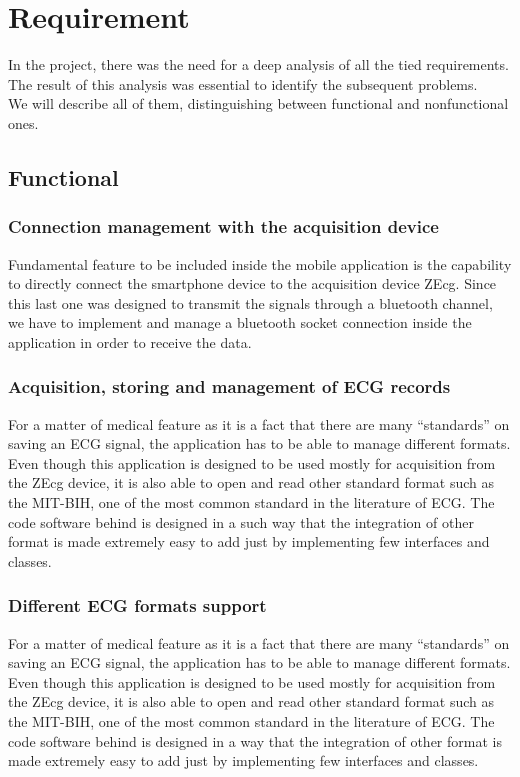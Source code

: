 \chapter{Requirement}
\label{Chapter5}
In the project, there was the need for a deep analysis of all the tied requirements. The result of this analysis was essential to identify the subsequent problems.\\
We will describe all of them, distinguishing between functional and nonfunctional ones.

\section{Functional}

\subsection{Connection management with the acquisition device}
Fundamental feature to be included inside the mobile application is the capability to directly connect the smartphone device to the acquisition device ZEcg. Since this last one was designed to transmit the signals through a bluetooth channel, we have to implement and manage a bluetooth socket connection inside the application in order to receive the data.

\subsection{Acquisition, storing and management of ECG records}
For a matter of medical feature as it is a fact that there are many “standards” on saving an ECG signal, the application has to be able to manage different formats. Even though this application is designed to be used mostly for acquisition from the ZEcg device, it is also able to open and read other standard format such as the MIT-BIH, one of the most common standard in the literature of ECG. The code software behind is designed in a such  way that the integration of other format is made extremely easy to add just by implementing few interfaces and classes.

\subsection{Different ECG formats support}
For a matter of medical feature as it is a fact that there are many “standards” on saving an ECG signal, the application has to be able to manage different formats. Even though this application is designed to be used mostly for acquisition from the ZEcg device, it is also able to open and read other standard format such as the MIT-BIH, one of the most common standard in the literature of ECG. The code software behind is designed in a way that the integration of other format is made extremely easy to add just by implementing few interfaces and classes.

